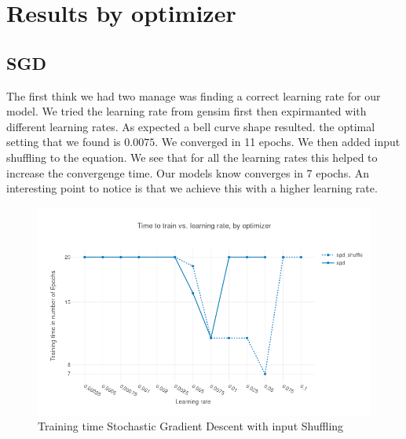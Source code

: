 \section{Results by optimizer}
\subsection{SGD}
The first think we had two manage was finding a correct learning rate for our model. We tried the learning rate from gensim first then expirmanted with different learning rates. As expected a bell curve shape resulted. the optimal setting that we found is $0.0075$. We converged in 11 epochs. 
We then added input shuffling to the equation. We see that for all the learning rates this helped to increase the convergenge time. Our models know converges in 7 epochs. An interesting point to notice is that we achieve this with a higher learning rate. 
\begin{figure}[H]
    \centering
			\includegraphics[scale=0.45]{images/results_sgd_shuffle} 
    \caption{Training time Stochastic Gradient Descent with input Shuffling}
    \label{fig:results_sgd}
\end{figure}
